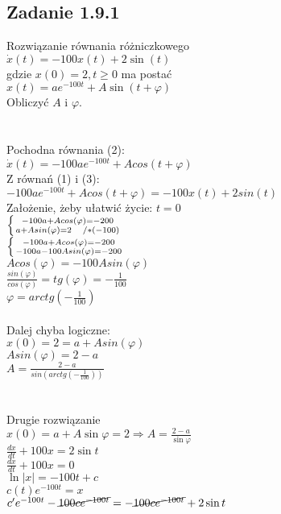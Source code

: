 \subsection*{Zadanie 1.9.1} {\color{darkgray}
	Rozwiązanie równania różniczkowego\\
	$\dot{x}(t)=-100x(t)+2\sin(t)$\\
	gdzie $x(0)=2, t\geqslant 0$ ma postać\\
	$x(t)=ae^{-100t}+A\sin(t+\varphi)$\\
	Obliczyć $A$ i $\varphi$.\\
}\lineh
\\\\
Pochodna równania (2):\\
$\dot{x}(t) = -100ae^{-100t} + A cos(t + \varphi) $\\
Z równań (1) i (3):\\
$-100ae^{-100t} + A cos(t + \varphi) = -100x(t) + 2sin(t)$\\
Założenie, żeby ułatwić życie: $t = 0$\\
$ \left \{ {{-100a + A cos(\varphi) = -200} \atop {a + A sin(\varphi) = 2} \quad /*(-100)} \right. $\\
$ \left \{ {{-100a + A cos(\varphi) = -200} \atop {-100a -100A sin(\varphi) = -200}} \right. $\\
$A cos(\varphi) = -100A sin(\varphi)$\\
$\frac{sin(\varphi)}{cos(\varphi)} = tg(\varphi) = -\frac{1}{100}$\\
$\varphi = arctg(-\frac{1}{100})$\\
\\
Dalej chyba logiczne:\\
$x(0) = 2 = a + A sin(\varphi)$\\
$A sin(\varphi) = 2-a$\\
$A = \frac{2-a}{sin(arctg(-\frac{1}{100}))}$\\
\lineh
\\\\
{\color{red} Drugie rozwiązanie}\\
$x(0)=a+A\sin \varphi =2 \Rightarrow \boxed{A=\frac{2-a}{\sin \varphi}}$\\
$\frac{dx}{dt}+100x=2\sin t$\\
$\frac{dx}{dt}+100x=0$\\
$\ln|x|=-100t+c$\\
$c(t)e^{-100t}=x$\\
$c'e^{-100t}-\cancel{100ce^{-100t}}=-\cancel{100ce^{-100t}}+2\sin t$\\
